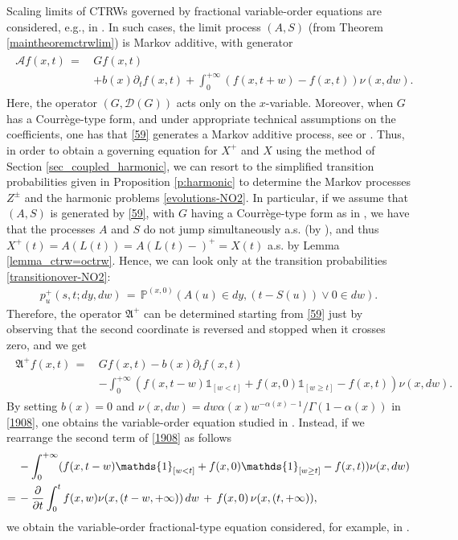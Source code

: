 \documentclass[reqno]{amsart}
\theoremstyle{remark}
\numberwithin{equation}{section} %
\newcommand{\1}{\mathds{1}}
\begin{document}
	Scaling limits of CTRWs governed by fractional variable-order equations are considered, e.g., in \cite{Kolokoltsov2023variable, STRAKA2018451}. In such cases, the limit process $(A,S)$ (from Theorem \ref{maintheoremctrwlim}) is Markov additive, with generator
	\begin{align}
		\begin{split}
			\mathcal{A}f(x,t) \, = \, &Gf(x,t)\\
			&+b(x)  \partial_t f(x,t) + \int_0^{+\infty} \left( f(x,t+w) -f(x,t) \right) \nu(x,dw).
		\end{split} \label{59}
	\end{align}
	Here, the operator $(G, \mathcal{D}(G))$ acts only on the $x$-variable. Moreover, when $G$ has a Courr\`ege-type form, and under appropriate technical assumptions on the coefficients, one has that \eqref{59} generates a Markov additive process, see \cite[Section 4]{Meerschaert2014} or \cite[Section 2]{savtoa}. Thus, in order to obtain a governing equation for $X^+$ and $X$ using the method of Section \ref{sec_coupled_harmonic}, we can resort to the simplified transition probabilities given in Proposition \ref{p:harmonic} to determine the Markov processes $Z^\pm$ and the harmonic problems \eqref{evolutions-NO2}. In particular, if we assume that $(A,S)$ is generated by \eqref{59}, with $G$ having a Courr\`ege-type form as in \cite[Section 3]{savtoa}, we have that the processes $A$ and $S$ do not jump simultaneously a.s. (by \cite[Lemma 3.2]{savtoa}), and thus $X^+(t)=A(L(t))=A(L(t)-)^+=X(t)$ a.s. by Lemma \ref{lemma_ctrw=octrw}. Hence, we can look only at the transition probabilities \eqref{transitionover-NO2}:
	\begin{align}
		p^+_u(s,t;dy,dw) \, = \, \mathds{P}^{(x,0)} \left( A(u) \in dy, (t-S(u)) \vee 0 \in dw \right).
	\end{align}
	Therefore, the operator $\mathfrak{A}^+$ can be determined starting from \eqref{59} just by observing that the second coordinate is reversed and stopped when it crosses zero, and we get
	\begin{align}
		\begin{split}
			\mathfrak{A}^+f(x,t) \, = \, &Gf(x,t) -b(x) \partial_tf(x,t) \\
			&  -\int_0^{+\infty} (f(x,t-w) \mathds{1}_{[w<t]} +f(x,0) \mathds{1}_{[w \geq t]} -f(x,t) ) \nu(x, dw).
		\end{split}
		\label{1908}
	\end{align}
	By setting $b(x)=0$ and $\nu(x,dw) =dw \alpha(x) w^{-\alpha(x)-1}/\Gamma(1-\alpha(x))$ in \eqref{1908}, one obtains the variable-order equation studied in \cite{Kolokoltsov2023variable}. Instead, if we rearrange the second term of \eqref{1908} as follows
	\begin{align}
		&-\int_0^{+\infty} (f(x,t-w) \mathds{1}_{[w<t]} +f(x,0) \mathds{1}_{[w \geq t]} -f(x,t) ) \nu(x, dw) \notag \\
		= \, & -\frac{\partial}{\partial t} \int_0^t f(x,w) \nu(x,(t-w, +\infty)) \, dw \, + \,  f(x,0) \, \nu(x,(t, +\infty)),
	\end{align}
	we obtain the variable-order fractional-type equation considered, for example, in \cite{savtoa}.
	
\end{document}
